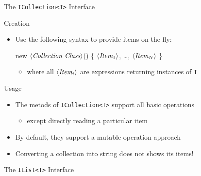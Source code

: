 \documentclass[presentation]{beamer}
\newcommand{\cscat}[1]{$\langle\text{{\itshape#1}}\rangle$}
\begin{document}
\begin{frame}[allowframebreaks]{The \texttt{ICollection<T>} Interface}


  \begin{block}{Creation}
    \begin{itemize}
      \item Use the following syntax to provide \alert{items} on the fly:
      \begin{center}\ttfamily
        new \cscat{Collection Class}() \{ \cscat{Item$_1$}, \ldots, \cscat{Item$_N$} \}
      \end{center}
      
      \begin{itemize}
        \item where all \texttt{\cscat{Item$_i$}} are expressions returning instances of \alert{\texttt{T}}
      \end{itemize}
    \end{itemize}
  \end{block}

  \begin{block}{Usage}
    \begin{itemize}
      \item The metods of \texttt{ICollection<T>} support all basic operations
      \begin{itemize}
        \item except directly reading a particular item
      \end{itemize}
      \item By default, they support a \alert{mutable} operation approach
      \item Converting a collection into string \alert{does not shows its items}!
    \end{itemize}
  \end{block}

  \framebreak

  
\end{frame}

\begin{frame}[allowframebreaks]{The \texttt{IList<T>} Interface}


  
  \framebreak

  
\end{frame}
\end{document}
